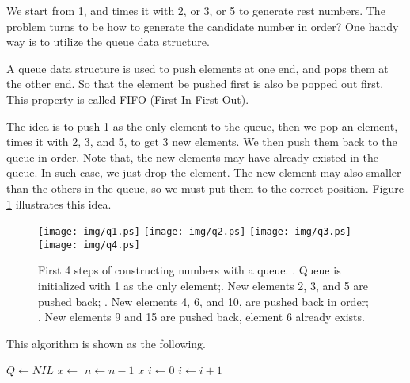 \documentclass[UTF8]{article}
\begin{document}
We start from 1, and times it with 2, or 3, or 5 to generate rest numbers.
The problem turns to be how to generate the candidate number in order?
One handy way is to utilize the queue data structure.

A queue data structure is used to push elements at one end, and pops
them at the other end. So that the element be pushed first is also
be popped out first. This property is called FIFO (First-In-First-Out).

The idea is to push 1 as the only element to the queue, then we pop
an element, times it with 2, 3, and 5, to get 3 new elements. We
then push them back to the queue in order. Note that, the new elements may
have already existed in the queue. In such case, we just drop the
element. The new element may also smaller than the others in the queue,
so we must put them to the correct position. Figure \ref{fig:queues}
illustrates this idea.

\begin{figure}[htbp]
       \begin{center}
       	  \texttt{[image: img/q1.ps]}
       	  \texttt{[image: img/q2.ps]}
       	  \texttt{[image: img/q3.ps]}
       	  \texttt{[image: img/q4.ps]}
        \caption{First 4 steps of constructing numbers with a queue. . Queue is initialized with 1 as the only element;. New elements 2, 3, and 5 are pushed back; . New elements 4, 6, and 10, are pushed back in order; . New elements 9 and 15 are pushed back, element 6 already exists.} \label{fig:queues}
       \end{center}
\end{figure}

This algorithm is shown as the following.

\begin{algorithmic}[1]
  \State $Q \gets NIL$
  \State {}
    \State $x \gets$ 
    \State {}
    \State {}
    \State {}
    \State $n \gets n-1$
  \EndWhile
  \State \Return $x$
\EndFunction
\Statex
{}
  \State $i \gets 0$
    \State $i \gets i + 1$
  \EndWhile
    \State \Return
  \EndIf
  \State {}
\EndFunction
\end{algorithmic}
\end{document}
